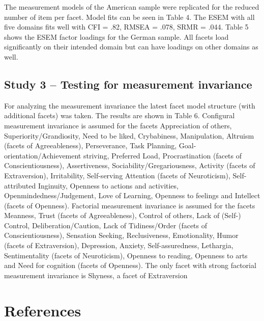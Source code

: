 \documentclass[man]{apa6}
\theoremstyle{definition}
\theoremstyle{definition}
\theoremstyle{definition}
\theoremstyle{remark}
\begin{document}
The measurement models of the American sample were replicated for the
reduced number of item per facet. Model fits can be seen in Table 4. The
ESEM with all five domains fits well with CFI = .82, RMSEA = .078, SRMR
= .044. Table 5 shows the ESEM factor loadings for the German sample.
All facets load significantly on their intended domain but can have
loadings on other domains as well.

\hypertarget{study-3-testing-for-measurement-invariance}{%
\subsection{Study 3 -- Testing for measurement
invariance}\label{study-3-testing-for-measurement-invariance}}

For analyzing the measurement invariance the latest facet model
structure (with additional facets) was taken. The results are shown in
Table 6. Configural measurement invariance is assumed for the facets
Appreciation of others, Superiority/Grandiosity, Need to be liked,
Crybabiness, Manipulation, Altruism (facets of Agreeableness),
Perseverance, Task Planning, Goal-orientation/Achievement striving,
Preferred Load, Procrastination (facets of Conscientiousness),
Assertiveness, Sociability/Gregariousness, Activity (facets of
Extraversion), Irritability, Self-serving Attention (facets of
Neuroticism), Self-attributed Inginuity, Openness to actions and
activities, Openmindedness/Judgement, Love of Learning, Openness to
feelings and Intellect (facets of Openness). Factorial measurement
invariance is assumed for the facets Meanness, Trust (facets of
Agreeableness), Control of others, Lack of (Self-) Control,
Deliberation/Caution, Lack of Tidiness/Order (facets of
Conscientiousness), Sensation Seeking, Reclusiveness, Emotionality,
Humor (facets of Extraversion), Depression, Anxiety, Self-assuredness,
Lethargia, Sentimentality (facets of Neuroticism), Openness to reading,
Openness to arts and Need for cognition (facets of Openness). The only
facet with strong factorial measurement invariance is Shyness, a facet
of Extraversion

\newpage

\hypertarget{references}{%
\section{References}\label{references}}

\begingroup
\setlength{\parindent}{-0.5in}
\setlength{\leftskip}{0.5in}
\end{document}
